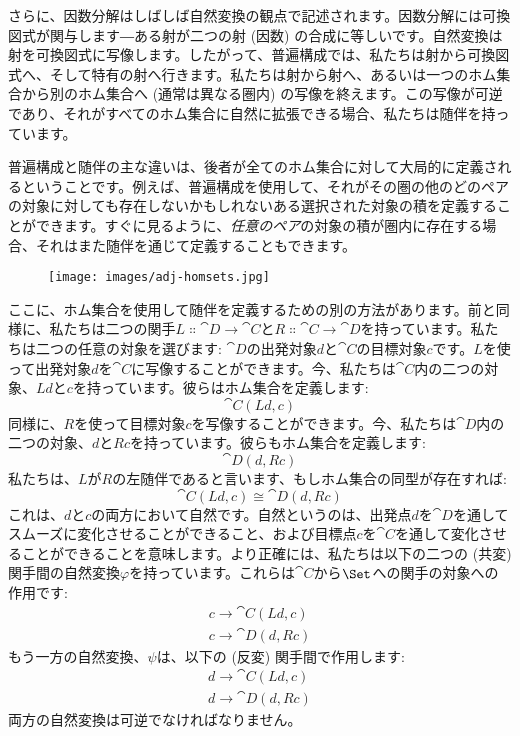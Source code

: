 さらに、因数分解はしばしば自然変換の観点で記述されます。因数分解には可換図式が関与します―ある射が二つの射 (因数) の合成に等しいです。自然変換は射を可換図式に写像します。したがって、普遍構成では、私たちは射から可換図式へ、そして特有の射へ行きます。私たちは射から射へ、あるいは一つのホム集合から別のホム集合へ (通常は異なる圏内) の写像を終えます。この写像が可逆であり、それがすべてのホム集合に自然に拡張できる場合、私たちは随伴を持っています。

普遍構成と随伴の主な違いは、後者が全てのホム集合に対して大局的に定義されるということです。例えば、普遍構成を使用して、それがその圏の他のどのペアの対象に対しても存在しないかもしれないある選択された対象の積を定義することができます。すぐに見るように、\emph{任意のペア}の対象の積が圏内に存在する場合、それはまた随伴を通じて定義することもできます。

\begin{figure}[H]
  \centering
  \texttt{[image: images/adj-homsets.jpg]}
\end{figure}

\noindent
ここに、ホム集合を使用して随伴を定義するための別の方法があります。前と同様に、私たちは二つの関手$L \Colon \cat{D} \to \cat{C}$と$R \Colon \cat{C} \to \cat{D}$を持っています。私たちは二つの任意の対象を選びます: $\cat{D}$の出発対象$d$と$\cat{C}$の目標対象$c$です。$L$を使って出発対象$d$を$\cat{C}$に写像することができます。今、私たちは$\cat{C}$内の二つの対象、$L d$と$c$を持っています。彼らはホム集合を定義します: 
\[\cat{C}(L d, c)\]
同様に、$R$を使って目標対象$c$を写像することができます。今、私たちは$\cat{D}$内の二つの対象、$d$と$R c$を持っています。彼らもホム集合を定義します: 
\[\cat{D}(d, R c)\]
私たちは、$L$が$R$の左随伴であると言います、もしホム集合の同型が存在すれば: 
\[\cat{C}(L d, c) \cong \cat{D}(d, R c)\]
これは、$d$と$c$の両方において自然です。自然というのは、出発点$d$を$\cat{D}$を通してスムーズに変化させることができること、および目標点$c$を$\cat{C}$を通して変化させることができることを意味します。より正確には、私たちは以下の二つの (共変) 関手間の自然変換$\varphi$を持っています。これらは$\cat{C}$から$\Set$への関手の対象への作用です: 
\begin{gather*}
  c \to \cat{C}(L d, c) \\
  c \to \cat{D}(d, R c)
\end{gather*}
もう一方の自然変換、$\psi$は、以下の (反変) 関手間で作用します: 
\begin{gather*}
  d \to \cat{C}(L d, c) \\
  d \to \cat{D}(d, R c)
\end{gather*}
両方の自然変換は可逆でなければなりません。

